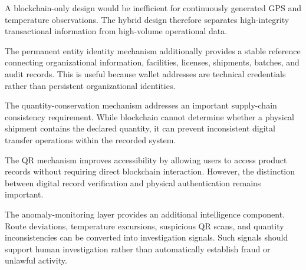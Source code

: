 \documentclass[11pt,a4paper]{article}
\begin{document}
A blockchain-only design would be inefficient for continuously generated GPS and temperature observations. The hybrid design therefore separates high-integrity transactional information from high-volume operational data.

The permanent entity identity mechanism additionally provides a stable reference connecting organizational information, facilities, licenses, shipments, batches, and audit records. This is useful because wallet addresses are technical credentials rather than persistent organizational identities.

The quantity-conservation mechanism addresses an important supply-chain consistency requirement. While blockchain cannot determine whether a physical shipment contains the declared quantity, it can prevent inconsistent digital transfer operations within the recorded system.

The QR mechanism improves accessibility by allowing users to access product records without requiring direct blockchain interaction. However, the distinction between digital record verification and physical authentication remains important.

The anomaly-monitoring layer provides an additional intelligence component. Route deviations, temperature excursions, suspicious QR scans, and quantity inconsistencies can be converted into investigation signals. Such signals should support human investigation rather than automatically establish fraud or unlawful activity.
\end{document}
